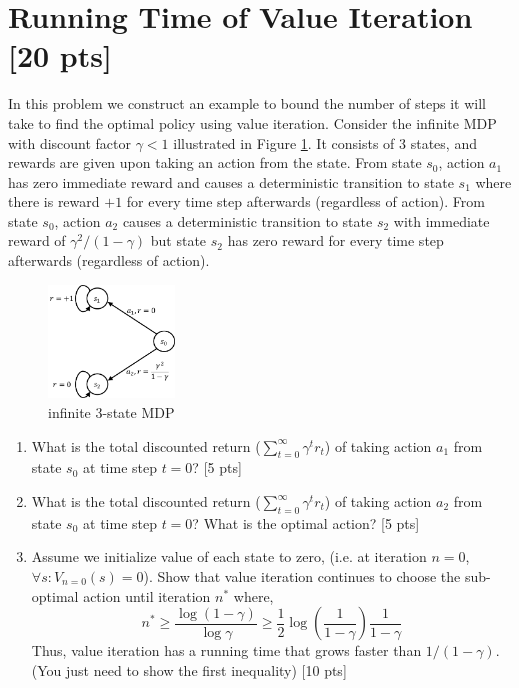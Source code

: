\documentclass[11pt]{article}
\begin{document}
\section{Running Time of Value Iteration [20 pts]}
In this problem we construct an example to bound the number of steps it will take to find the optimal policy using value iteration. Consider the infinite MDP with discount factor $\gamma < 1$ illustrated in Figure \ref{fig:Q2}. It consists of 3 states, and rewards are given upon taking an action from the state. From state $s_0$, action $a_1$ has zero immediate reward and causes a deterministic transition to state $s_1$ where there is reward $+1$ for every time step afterwards (regardless of action). From state $s_0$, action $a_2$ causes a deterministic transition to state $s_2$ with immediate reward of $\gamma^2/(1-\gamma)$ but state $s_2$ has zero reward for every time step afterwards (regardless of action).

\begin{figure}[h]
  \centering
    \includegraphics[width=0.3\textwidth]{Q2.pdf}
    \caption{infinite 3-state MDP}
  	\label{fig:Q2}
\end{figure}

\begin{enumerate}[label=(\alph*)]
\item What is the total discounted return ($\sum_{t=0}^{\infty}\gamma^t r_t$) of taking action $a_1$ from state $s_0$ at time step $t=0$? [5 pts]


\item What is the total discounted return ($\sum_{t=0}^{\infty}\gamma^t r_t$) of taking action $a_2$ from state $s_0$ at time step $t=0$? What is the optimal action? [5 pts]


\item Assume we initialize value of each state to zero, (i.e. at iteration $n=0$, $\forall s: V_{n=0}(s) = 0$). Show that value iteration continues to choose the sub-optimal action until iteration $n^*$ where, 
$$n^* \geq \frac{\log(1-\gamma)}{\log\gamma} \geq \frac{1}{2} \log (\frac{1}{1-\gamma})\frac{1}{1-\gamma}$$
Thus, value iteration has a running time that grows faster than $1/(1-\gamma)$. (You just need to show the first inequality) [10 pts]


\end{enumerate}
\end{document}
